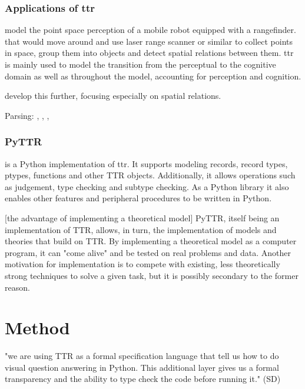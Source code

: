 \documentclass[11pt, a4paper]{article}
\begin{document}
\subsubsection{Applications of \gls{ttr}}

\cite{lspc} model the point space perception of a mobile robot equipped with a rangefinder.
 that would move around and use laser range scanner or similar to collect points in space, group them into objects and detect spatial relations between them.
\Gls{ttr} is mainly used to model the transition from the perceptual to the cognitive domain as well as 
 throughout the model, accounting for perception and cognition.

\cite{ttrspat} develop this further, focusing especially on spatial relations.

Parsing: \cite{CooperRecordsRecordTypes2005}, \cite{RobinCooperAustiniantruthattitudes2005}, \cite{CooperTypetheorysemantics2012}, \cite{CooperTypetheorylanguage2016}



\subsubsection{PyTTR}

\cite{pyttr} is a Python implementation of \gls{ttr}.
It supports modeling records, record types, ptypes, functions and other TTR objects.
Additionally, it allows operations such as judgement, type checking and subtype checking.
As a Python library it also enables other features and peripheral procedures to be written in Python.

[the advantage of implementing a theoretical model]
PyTTR, itself being an implementation of TTR, allows, in turn, the implementation of models and theories that build on TTR.
By implementing a theoretical model as a computer program, it can "come alive" and be tested on real problems and data.
Another motivation for implementation is to compete with existing, less theoretically strong techniques to solve a given task, but it is possibly secondary to the former reason.




\section{Method}
\label{sec:method}

"we are using TTR as a formal specification language that tell us how to do visual question answering in Python. This additional layer gives us a formal transparency and the ability to type check the code before running it." (SD)
\end{document}
